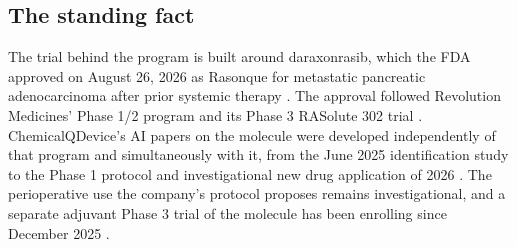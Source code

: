 \subsection{The standing fact}

The trial behind the program is built around daraxonrasib, which the FDA
approved on August 26, 2026 as Rasonque for metastatic pancreatic adenocarcinoma
after prior systemic therapy \cite{fdarasonque2026,fdadisco2026,revmedapproval2026}.
The approval followed Revolution Medicines' Phase 1/2 program and its Phase 3
RASolute 302 trial \cite{ctgov001,ctgov302,rasolute302}. ChemicalQDevice's AI
papers on the molecule were developed independently of that program and
simultaneously with it, from the June 2025 identification study
\cite{daraxident} to the Phase 1 protocol and investigational new drug
application of 2026 \cite{onpremwhippl,phase1ind}. The perioperative use the
company's protocol proposes remains investigational, and a separate adjuvant
Phase 3 trial of the molecule has been enrolling since December 2025
\cite{ctgov304}.
